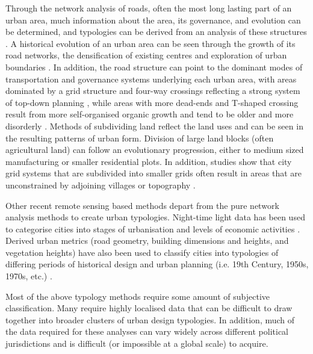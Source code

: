 \documentclass[10pt,letterpaper,hidelinks]{article}
\begin{document}
Through the network analysis of roads, often the most long lasting part of an urban area, much information about the area, its governance, and evolution can be determined, and typologies can be derived from an analysis of these structures \cite{Porta2006a}. A historical evolution of an urban area can be seen through the growth of its road networks, the densification of existing centres and exploration of urban boundaries \cite{Strano2012}. In addition, the road structure can point to the dominant modes of transportation and governance systems underlying each urban area, with areas dominated by a grid structure and four-way crossings reflecting a strong system of top-down planning \cite{Courtat2011}, while areas with more dead-ends and T-shaped crossing result from more self-organised organic growth \cite{Cardillo2006} and tend to be older and more disorderly \cite{Jacobs1961}. Methods of subdividing land reflect the land uses and can be seen in the resulting patterns of urban form. Division of large land blocks (often agricultural land) can follow an evolutionary progression, either to medium sized manufacturing or smaller residential plots. In addition, studies show that city grid systems that are subdivided into smaller grids often result in areas that are unconstrained by adjoining villages or topography \cite{Strano2012}. 

Other recent remote sensing based methods depart from the pure network analysis methods to create urban typologies. Night-time light data has been used to categorise cities into stages of urbanisation and levels of economic activities \cite{Zhang2013}. Derived urban metrics (road geometry, building dimensions and heights, and vegetation heights) have also been used to classify cities into typologies of differing periods of historical design and urban planning (i.e. 19th Century, 1950s, 1970s, etc.) \cite{Hermosilla2014}.

Most of the above typology methods require some amount of subjective classification. Many require highly localised data that can be difficult to draw together into broader clusters of urban design typologies. In addition, much of the data required for these analyses can vary widely across different political jurisdictions and is difficult (or impossible at a global scale) to acquire. 
\end{document}
